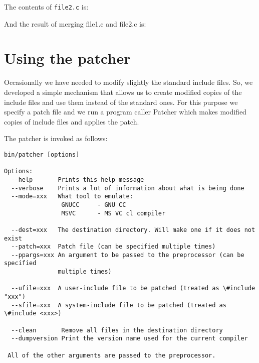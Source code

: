 \documentclass{article}
\def\t#1{{\tt #1}}
\begin{document}
 The contents of \t{file2.c} is:


 And the result of merging file1.c and file2.c is:


    \section{Using the patcher}\label{sec-patcher}

 Occasionally we have needed to modify slightly the standard include files.
So, we developed a simple mechanism that allows us to create modified copies
of the include files and use them instead of the standard ones. For this
purpose we specify a patch file and we run a program caller Patcher which
makes modified copies of include files and applies the patch.

 The patcher is invoked as follows: 
\begin{verbatim}
bin/patcher [options]

Options:
  --help       Prints this help message
  --verbose    Prints a lot of information about what is being done
  --mode=xxx   What tool to emulate: 
                GNUCC     - GNU CC
                MSVC      - MS VC cl compiler

  --dest=xxx   The destination directory. Will make one if it does not exist
  --patch=xxx  Patch file (can be specified multiple times)
  --ppargs=xxx An argument to be passed to the preprocessor (can be specified
               multiple times)

  --ufile=xxx  A user-include file to be patched (treated as \#include "xxx")
  --sfile=xxx  A system-include file to be patched (treated as \#include <xxx>)
 
  --clean       Remove all files in the destination directory
  --dumpversion Print the version name used for the current compiler

 All of the other arguments are passed to the preprocessor.
\end{verbatim}
\end{document}
